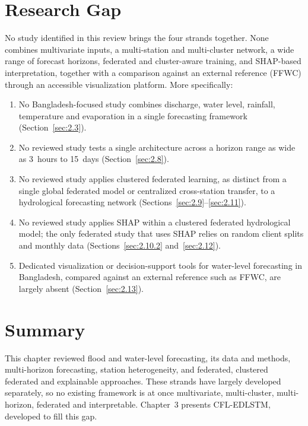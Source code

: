 \section{Research Gap}
\label{sec:2.15}

No study identified in this review brings the four strands together. None
combines multivariate inputs, a multi-station and multi-cluster network, a wide
range of forecast horizons, federated and cluster-aware training, and
SHAP-based interpretation, together with a comparison against an external
reference (FFWC) through an accessible visualization platform. More
specifically:

\begin{enumerate}
    \item No Bangladesh-focused study combines discharge, water level,
    rainfall, temperature and evaporation in a single forecasting framework
    (Section~\ref{sec:2.3}).
    \item No reviewed study tests a single architecture across a horizon range
    as wide as 3~hours to 15~days (Section~\ref{sec:2.8}).
    \item No reviewed study applies clustered federated learning, as distinct
    from a single global federated model or centralized cross-station
    transfer, to a hydrological forecasting network
    (Sections~\ref{sec:2.9}--\ref{sec:2.11}).
    \item No reviewed study applies SHAP within a clustered federated
    hydrological model; the only federated study that uses SHAP relies on
    random client splits and monthly data (Sections~\ref{sec:2.10.2}
    and~\ref{sec:2.12}).
    \item Dedicated visualization or decision-support tools for water-level
    forecasting in Bangladesh, compared against an external reference such as
    FFWC, are largely absent (Section~\ref{sec:2.13}).
\end{enumerate}

\section{Summary}
\label{sec:2.16}

This chapter reviewed flood and water-level forecasting, its data and methods,
multi-horizon forecasting, station heterogeneity, and federated, clustered
federated and explainable approaches. These strands have largely developed
separately, so no existing framework is at once multivariate, multi-cluster,
multi-horizon, federated and interpretable. Chapter~3 presents CFL-EDLSTM,
developed to fill this gap.